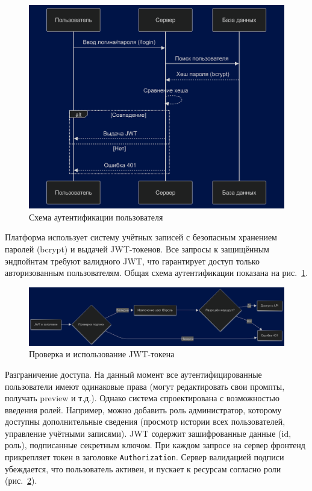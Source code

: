 \begin{figure}[htbp]
\centering
    \includegraphics[width=1\textwidth]{picture/diploma-deffence-algo-1.png}
\caption{Схема аутентификации пользователя}
\label{diagram_auth}
\end{figure}


Платформа использует систему учётных записей с безопасным хранением паролей (bcrypt) и выдачей JWT-токенов. Все запросы к защищённым эндпойнтам требуют валидного JWT, что гарантирует доступ только авторизованным пользователям. Общая схема аутентификации показана на рис.~\ref{diagram_auth}.


\begin{figure}[htbp]
\centering
    \includegraphics[width=1\textwidth]{picture/diploma-deffence-algo-2.png}
\caption{Проверка и использование JWT-токена}
\label{diagram_jwt}
\end{figure}

Разграничение доступа. На данный момент все аутентифицированные пользователи имеют одинаковые права (могут редактировать свои промпты, получать preview и т.д.). Однако система спроектирована с возможностью введения ролей. Например, можно добавить роль администратор, которому доступны дополнительные сведения (просмотр истории всех пользователей, управление учётными записями).  JWT содержит зашифрованные данные (id, роль), подписанные секретным ключом. При каждом запросе на сервер фронтенд прикрепляет токен в заголовке \texttt{Authorization}. Сервер валидацией подписи убеждается, что пользователь активен, и пускает к ресурсам согласно роли (рис.~\ref{diagram_jwt}).

